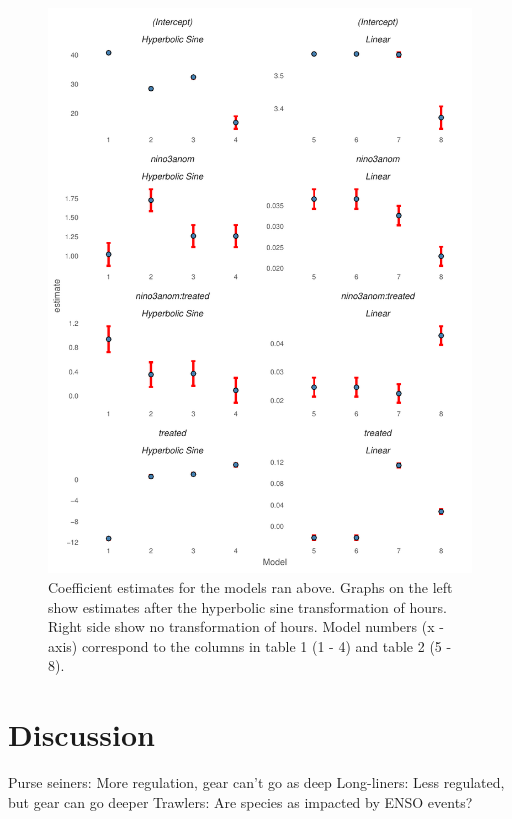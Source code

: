 \documentclass[11pt]{article}
\begin{document}
\clearpage



\begin{figure}
\centering
\includegraphics{../img/coef_estimates.pdf}
\caption{Coefficient estimates for the models ran above. Graphs on the left show estimates after the hyperbolic sine transformation of hours. Right side show no transformation of hours.
 Model numbers (x - axis) correspond to the columns in table 1 (1 - 4) and table 2 (5 - 8).}
\end{figure}

\section{Discussion}

Purse seiners: More regulation, gear can't go as deep
Long-liners: Less regulated, but gear can go deeper 
Trawlers: Are species as impacted by ENSO events?
\end{document}
